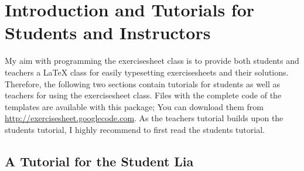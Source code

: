 \documentclass[a4paper,fleqn,9pt]{report}
\let\sffamily=\rmfamily
\def\exercisesheet{{exercisesheet}}
\begin{document}

\begin{abstract}
  The \exercisesheet{} class provides a convenient way to produce
  hiqh-quality exercise sheets for both students and teachers. This
  is the official manual. It contains tutorials for students and
  teachers that explain the first steps in using this class.
  Moreover, a complete list of the commands defined by the
  \exercisesheet{} class is contained.
\end{abstract}

\tableofcontents

\chapter{Introduction and Tutorials for Students and Instructors}

My aim with programming the \exercisesheet{} class is to provide both
students and teachers a \LaTeX{} class for easily typesetting
exercisesheets and their solutions. Therefore, the following two
sections contain tutorials for students as well as teachers for using
the \exercisesheet{} class. Files with the complete code of the
templates are available with this package; You can download them from
\url{http://exercisesheet.googlecode.com}. As the teachers tutorial
builds upon the students tutorial, I highly recommend to first read
the students tutorial.

\section{A Tutorial for the Student Lia}
\end{document}
